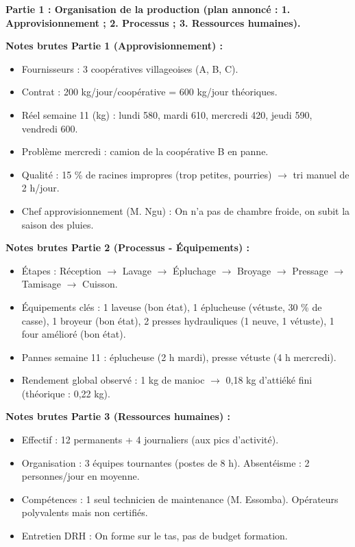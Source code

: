 \documentclass[11pt]{article}
\begin{document}
\begin{experience}
\textbf{Partie 1 : Organisation de la production (plan annoncé : 1. Approvisionnement ; 2. Processus ; 3. Ressources humaines).}

\textbf{Notes brutes Partie 1 (Approvisionnement) :}
\begin{itemize}
    \item Fournisseurs : 3 coopératives villageoises (A, B, C).
    \item Contrat : 200 kg/jour/coopérative = 600 kg/jour théoriques.
    \item Réel semaine 11 (kg) : lundi 580, mardi 610, mercredi 420, jeudi 590, vendredi 600.
    \item Problème mercredi : camion de la coopérative B en panne.
    \item Qualité : 15 \% de racines impropres (trop petites, pourries) $\rightarrow$ tri manuel de 2 h/jour.
    \item Chef approvisionnement (M. Ngu) : \og On n'a pas de chambre froide, on subit la saison des pluies. \fg{}
\end{itemize}

\textbf{Notes brutes Partie 2 (Processus - Équipements) :}
\begin{itemize}
    \item Étapes : Réception $\rightarrow$ Lavage $\rightarrow$ Épluchage $\rightarrow$ Broyage $\rightarrow$ Pressage $\rightarrow$ Tamisage $\rightarrow$ Cuisson.
    \item Équipements clés : 1 laveuse (bon état), 1 éplucheuse (vétuste, 30 \% de casse), 1 broyeur (bon état), 2 presses hydrauliques (1 neuve, 1 vétuste), 1 four amélioré (bon état).
    \item Pannes semaine 11 : éplucheuse (2 h mardi), presse vétuste (4 h mercredi).
    \item Rendement global observé : 1 kg de manioc $\rightarrow$ 0,18 kg d'attiéké fini (théorique : 0,22 kg).
\end{itemize}

\textbf{Notes brutes Partie 3 (Ressources humaines) :}
\begin{itemize}
    \item Effectif : 12 permanents + 4 journaliers (aux pics d'activité).
    \item Organisation : 3 équipes tournantes (postes de 8 h). Absentéisme : 2 personnes/jour en moyenne.
    \item Compétences : 1 seul technicien de maintenance (M. Essomba). Opérateurs polyvalents mais non certifiés.
    \item Entretien DRH : \og On forme sur le tas, pas de budget formation. \fg{}
\end{itemize}


\end{experience}
\end{document}
